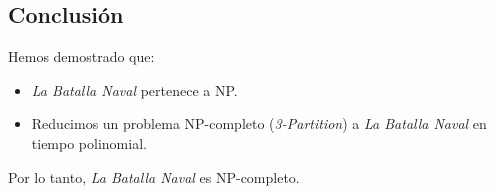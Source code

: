 \subsection*{Conclusión}

Hemos demostrado que:
\begin{itemize}
    \item \textit{La Batalla Naval} pertenece a NP.
    \item Reducimos un problema NP-completo (\textit{3-Partition}) a \textit{La Batalla Naval} en tiempo polinomial.
\end{itemize}

Por lo tanto, \textit{La Batalla Naval} es NP-completo.
